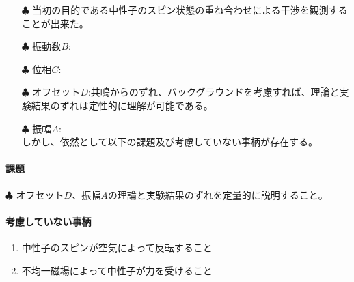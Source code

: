 \begin{itemize}
\item[$\clubsuit$]当初の目的である中性子のスピン状態の重ね合わせによる干渉を観測することが出来た。\\
\item[$\clubsuit$]振動数$B$:\\
\item[$\clubsuit$]位相$C$:\\
\item[$\clubsuit$]オフセット$D$:共鳴からのずれ、バックグラウンドを考慮すれば、理論と実験結果のずれは定性的に理解が可能である。\\
\item[$\clubsuit$]振幅$A$:\\
しかし、依然として以下の課題及び考慮していない事柄が存在する。
\end{itemize}
\paragraph{課題}
$\clubsuit$
オフセット$D$、振幅$A$の理論と実験結果のずれを定量的に説明すること。\\
\paragraph{考慮していない事柄}
\begin{enumerate}
\item 中性子のスピンが空気によって反転すること
\item 不均一磁場によって中性子が力を受けること
\end{enumerate}
